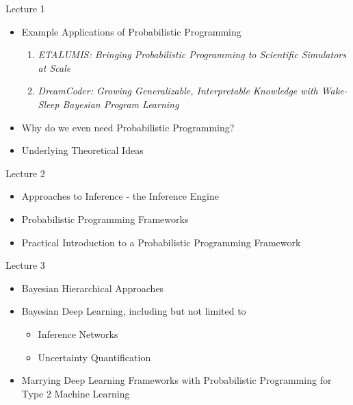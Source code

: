 \documentclass[AERbeamer%
              ,optEnglish%
              ,optBiber%
              ,optBibstyleAlphabetic%
              ,optBeamerClassicFormat%
              ]{AERlatex}%
\begin{document}
\begin{frame}[c]{Lecture 1}
    \centering
    \begin{itemize}
        \item Example Applications of Probabilistic Programming
        \begin{enumerate}
            \item \textit{ETALUMIS: Bringing Probabilistic Programming to Scientific Simulators at Scale}
            \item \textit{DreamCoder: Growing Generalizable, Interpretable Knowledge with Wake-Sleep Bayesian Program Learning}
        \end{enumerate}
        \item Why do we even need Probabilistic Programming?
        \item Underlying Theoretical Ideas
    \end{itemize}
\end{frame}


\begin{frame}[c]{Lecture 2}
    \centering
    \begin{itemize}
        \item Approaches to Inference - the Inference Engine
        \item Probabilistic Programming Frameworks
        \item Practical Introduction to a Probabilistic Programming Framework
    \end{itemize}
\end{frame}


\begin{frame}[c]{Lecture 3}
    \centering
    \begin{itemize}
        \item Bayesian Hierarchical Approaches
        \item Bayesian Deep Learning, including but not limited to
        \begin{itemize}
            \item Inference Networks
            \item Uncertainty Quantification
        \end{itemize}
        \item Marrying Deep Learning Frameworks with Probabilistic Programming for Type 2 Machine Learning
    \end{itemize}
\end{frame}
\end{document}
